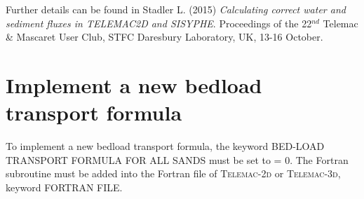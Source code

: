 Further details can be found in Stadler L. (2015) \textit{Calculating correct water and sediment fluxes in TELEMAC2D and SISYPHE}. Proceedings of the 22$^{nd}$
Telemac \& Mascaret User Club, STFC Daresbury Laboratory, UK, 13-16 October.

\section{Implement a new bedload transport formula}
To implement a new bedload transport formula, the keyword {\ttfamily BED-LOAD TRANSPORT FORMULA FOR ALL SANDS} must be set to {\ttfamily = 0}. The Fortran subroutine must be added into the Fortran file of \textsc{Telemac-2d} or \textsc{Telemac-3d}, keyword {\ttfamily FORTRAN FILE}.

